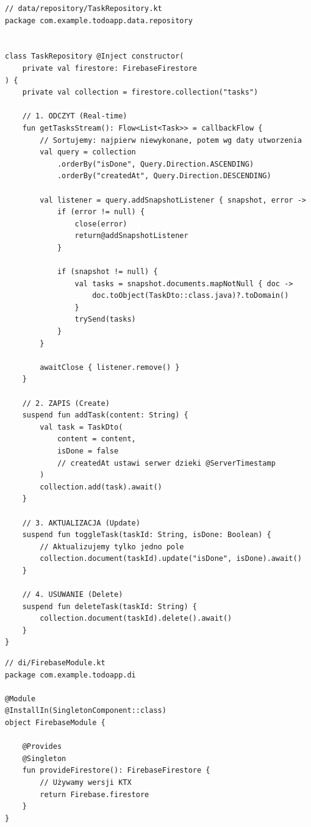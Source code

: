 \begin{verbatim}
// data/repository/TaskRepository.kt
package com.example.todoapp.data.repository


class TaskRepository @Inject constructor(
    private val firestore: FirebaseFirestore
) {
    private val collection = firestore.collection("tasks")

    // 1. ODCZYT (Real-time)
    fun getTasksStream(): Flow<List<Task>> = callbackFlow {
        // Sortujemy: najpierw niewykonane, potem wg daty utworzenia
        val query = collection
            .orderBy("isDone", Query.Direction.ASCENDING)
            .orderBy("createdAt", Query.Direction.DESCENDING)

        val listener = query.addSnapshotListener { snapshot, error ->
            if (error != null) {
                close(error)
                return@addSnapshotListener
            }

            if (snapshot != null) {
                val tasks = snapshot.documents.mapNotNull { doc ->
                    doc.toObject(TaskDto::class.java)?.toDomain()
                }
                trySend(tasks)
            }
        }

        awaitClose { listener.remove() }
    }

    // 2. ZAPIS (Create)
    suspend fun addTask(content: String) {
        val task = TaskDto(
            content = content,
            isDone = false
            // createdAt ustawi serwer dzieki @ServerTimestamp
        )
        collection.add(task).await()
    }

    // 3. AKTUALIZACJA (Update)
    suspend fun toggleTask(taskId: String, isDone: Boolean) {
        // Aktualizujemy tylko jedno pole
        collection.document(taskId).update("isDone", isDone).await()
    }

    // 4. USUWANIE (Delete)
    suspend fun deleteTask(taskId: String) {
        collection.document(taskId).delete().await()
    }
}
\end{verbatim}


\begin{verbatim}
// di/FirebaseModule.kt
package com.example.todoapp.di

@Module
@InstallIn(SingletonComponent::class)
object FirebaseModule {

    @Provides
    @Singleton
    fun provideFirestore(): FirebaseFirestore {
        // Używamy wersji KTX
        return Firebase.firestore 
    }
}
\end{verbatim}

